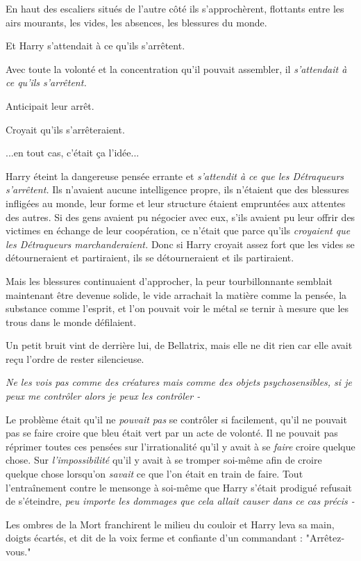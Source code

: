 En haut des escaliers situés de l'autre côté ils s'approchèrent, flottants entre les airs mourants, les vides, les absences, les blessures du monde.

Et Harry s'attendait à ce qu'ils s'arrêtent.

Avec toute la volonté et la concentration qu'il pouvait assembler, il \emph{s'attendait à ce qu'ils s'arrêtent.} 

Anticipait leur arrêt.

Croyait qu'ils s'arrêteraient.

...en tout cas, c'était ça l'idée...

Harry éteint la dangereuse pensée errante et \emph{s'attendit à ce que les Détraqueurs s'arrêtent.}  Ils n'avaient aucune intelligence propre, ils n'étaient que des blessures infligées au monde, leur forme et leur structure étaient empruntées aux attentes des autres. Si des gens avaient pu négocier avec eux, s'ils avaient pu leur offrir des victimes en échange de leur coopération, ce n'était que parce qu'ils \emph{croyaient que les Détraqueurs marchanderaient. } Donc si Harry croyait assez fort que les vides se détourneraient et partiraient, ils se détourneraient et ils partiraient.

Mais les blessures continuaient d'approcher, la peur tourbillonnante semblait maintenant être devenue solide, le vide arrachait la matière comme la pensée, la substance comme l'esprit, et l'on pouvait voir le métal se ternir à mesure que les trous dans le monde défilaient.

Un petit bruit vint de derrière lui, de Bellatrix, mais elle ne dit rien car elle avait reçu l'ordre de rester silencieuse.

\emph{Ne les vois pas comme des créatures mais comme des objets psychosensibles, si je peux me contrôler alors je peux les contrôler -} 

Le problème était qu'il ne \emph{pouvait pas}  se contrôler si facilement, qu'il ne pouvait pas se faire croire que bleu était vert par un acte de volonté. Il ne pouvait pas réprimer toutes ces pensées sur l'irrationalité qu'il y avait à se \emph{faire}  croire quelque chose. Sur \emph{l'impossibilité}  qu'il y avait à se tromper soi-même afin de croire quelque chose lorsqu'on \emph{savait}  ce que l'on était en train de faire. Tout l'entraînement contre le mensonge à soi-même que Harry s'était prodigué refusait de s'éteindre, \emph{peu importe les dommages que cela allait causer dans ce cas précis -} 

Les ombres de la Mort franchirent le milieu du couloir et Harry leva sa main, doigts écartés, et dit de la voix ferme et confiante d'un commandant : "Arrêtez-vous."

